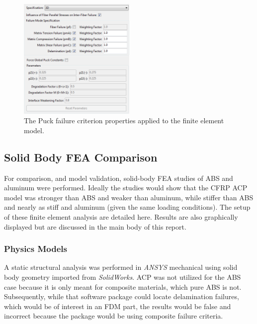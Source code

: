 \begin{figure}[htp]
\centering
\includegraphics[width=0.5\textwidth]{./figures/fea/fea-acp-puck-failure-criterion}
\caption{The Puck failure criterion properties applied to the finite element model.}
\label{fig:fea-acp-puck-failure-criterion}
\end{figure}

\clearpage

\subsection{Solid Body FEA Comparison}

\indent

For comparison, and model validation, solid-body FEA studies of ABS and aluminum were performed. Ideally the studies would show that the CFRP ACP model was stronger than ABS and weaker than aluminum, while stiffer than ABS and nearly as stiff and aluminum (given the same loading conditions). The setup of these finite element analysis are detailed here. Results are also graphically displayed but are discussed in the main body of this report.

\subsubsection{Physics Models}

\indent

A static structural analysis was performed in \emph{ANSYS} mechanical using solid body geometry imported from \emph{SolidWorks}. ACP was not utilized for the ABS case because it is only meant for composite materials, which pure ABS is not. Subsequently, while that software package could locate delamination failures, which would be of interest in an FDM part, the results would be false and incorrect because the package would be using composite failure criteria. \\

